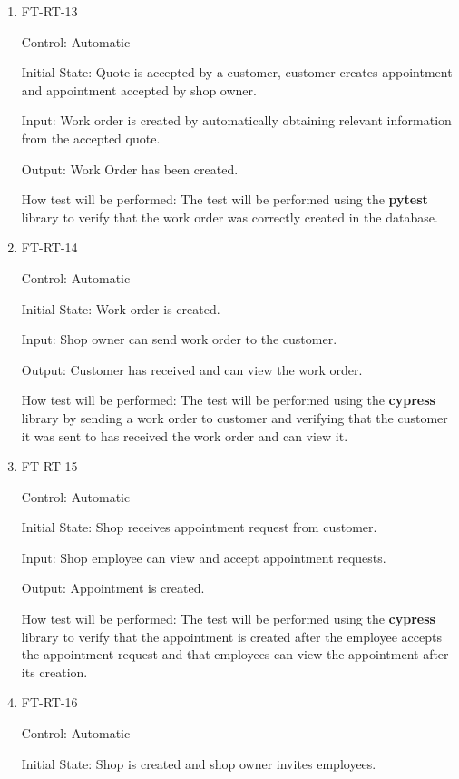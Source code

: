 \documentclass[12pt, titlepage]{article}
\begin{document}
\begin{enumerate}
\item{FT-RT-13\\}

Control: Automatic
					
Initial State: Quote is accepted by a customer, customer creates appointment and appointment accepted by shop owner.
					
Input: Work order is created by automatically obtaining relevant information from the accepted quote.
					
Output: Work Order has been created.

How test will be performed: The test will be performed using the \textbf{pytest} library to verify that the work order was correctly created in the database.

\item{FT-RT-14\\}

Control: Automatic
					
Initial State: Work order is created.
					
Input: Shop owner can send work order to the customer.
					
Output: Customer has received and can view the work order.

How test will be performed: The test will be performed using the \textbf{cypress} library by sending a work order to customer and verifying that the customer it was sent to has received the work order and can view it.

\item{FT-RT-15\\}

Control: Automatic

Initial State: Shop receives appointment request from customer.

Input: Shop employee can view and accept appointment requests.

Output: Appointment is created.

How test will be performed: The test will be performed using the \textbf{cypress} library to verify that the appointment is created after the employee accepts the appointment request and that employees can view the appointment after its creation.

\item{FT-RT-16\\}

Control: Automatic

Initial State: Shop is created and shop owner invites employees.


\end{enumerate}
\end{document}
